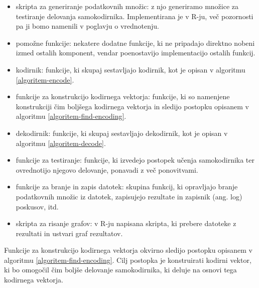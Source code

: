 \documentclass[12pt,a4paper]{article}
\begin{document}
\begin{itemize}
	\item skripta za generiranje podatkovnih množic: z njo generiramo množice za testiranje delovanja samokodirnika. 
	Implementirana je v R-ju, več pozornosti pa ji bomo namenili v poglavju o vrednotenju. %
	
	\item pomožne funkcije: nekatere dodatne funkcije, ki ne pripadajo direktno nobeni izmed ostalih komponent, 
	vendar poenostavijo implementacijo ostalih funkcij.

	\item kodirnik: funkcije, ki skupaj sestavljajo kodirnik, kot je opisan v algoritmu \ref{algoritem-encode}.

	\item funkcije za konstrukcijo kodirnega vektorja: 
	funkcije, ki so namenjene konstrukciji čim boljšega kodirnega vektorja in sledijo postopku opisanem v algoritmu \ref{algoritem-find-encoding}.

	\item dekodirnik: funkcije, ki skupaj sestavljajo dekodirnik, kot je opisan v algoritmu \ref{algoritem-decode}.

	\item funkcije za testiranje: funkcije, ki izvedejo postopek učenja samokodirnika ter ovrednotijo njegovo delovanje, ponavadi z več ponovitvami.

	\item funkcije za branje in zapis datotek: skupina funkcij, ki opravljajo branje podatkovnih množic iz datotek, zapisujejo rezultate in zapisnik (ang. log) poskusov, itd.

	\item skripta za risanje grafov: v R-ju napisana skripta, ki prebere datoteke z rezultati in ustvari graf rezultatov.
\end{itemize}



Funkcije za konstrukcijo kodirnega vektorja okvirno sledijo postopku opisanem v algoritmu \ref{algoritem-find-encoding}.
Cilj postopka je konstruirati kodirni vektor, ki bo omogočil čim boljše delovanje samokodirnika, ki deluje na osnovi tega kodirnega vektorja. %
\end{document}
